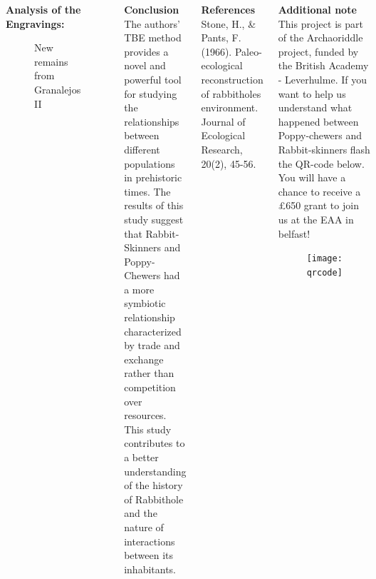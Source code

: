 \documentclass[final]{beamer}
\begin{document}
\begin{frame}[t]
\begin{columns}[t]
\begin{block}{\textbf{Analysis of the Engravings:}}
            \begin{figure}
                \label{fig:twomaps}
                \centering
                \caption{New remains from Granalejos II}
            \end{figure}

        \end{block}

    \vfill
    \begin{block}{\textbf{Conclusion}}
            The authors' TBE method provides a novel and powerful tool for studying the relationships between different populations in prehistoric times. The results of this study suggest that Rabbit-Skinners and Poppy-Chewers had a more symbiotic relationship characterized by trade and exchange rather than competition over resources. This study contributes to a better understanding of the history of Rabbithole and the nature of interactions between its inhabitants.
        \end{block}

        \begin{block}{\textbf{References}}
            Stone, H., \& Pants, F. (1966). Paleo-ecological reconstruction of rabbitholes environment. Journal of Ecological Research, 20(2), 45-56.
        \end{block}
        \vspace{8cm}
    \begin{block}{\textbf{Additional note}}
        \small
    This project is part of the Archaoriddle project, funded by the British Academy - Leverhulme. If you want to help us understand what happened between Poppy-chewers and Rabbit-skinners flash the QR-code below. You will have a chance to receive a £650 grant to join us at the EAA in belfast! 
            \begin{figure}
                \texttt{[image: qrcode]}
            \end{figure}
        \end{block}

    \end{columns}

\end{frame}
\end{document}
